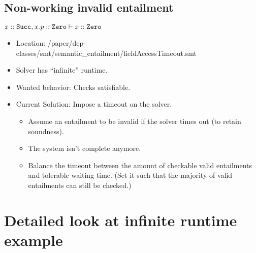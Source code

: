 \documentclass[a4paper]{article}
\begin{document}
\subsection{Non-working invalid entailment}
\label{example:field-access-timeout}
$\mathit{x} :: \mathit{\mathtt{Succ}}, \mathit{x.p} :: \mathit{\mathtt{Zero}} \vdash \mathit{x} :: \mathit{\mathtt{Zero}}$
\begin{itemize}
  \item Location: /paper/dep-classes/smt/semantic_entailment/fieldAccessTimeout.smt
  \item Solver has ``infinite'' runtime.
  \item Wanted behavior: Checks satisfiable.
  \item Current Solution: Impose a timeout on the solver.
  \begin{itemize}
    \item Assume an entailment to be invalid if the solver times out (to retain soundness).
    \item The system isn't complete anymore.
    \item Balance the timeout between the amount of checkable valid entailments and tolerable waiting time.
    (Set it such that the majority of valid entailments can still be checked.)
  \end{itemize}
\end{itemize}

\section{Detailed look at infinite runtime example}
\end{document}
